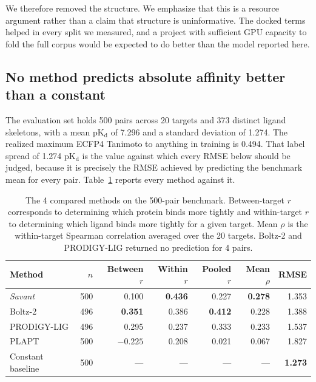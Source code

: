 \documentclass[times, twoside]{zHenriquesLab-StyleBioRxiv}
\newcommand{\savant}{\textit{Savant}\xspace}
\newcommand{\pkd}{\ensuremath{\mathrm{pK_d}}\xspace}
\begin{document}
We therefore removed the structure. We emphasize that this is a resource argument rather than a claim that structure is uninformative. The docked terms helped in every split we measured, and a project with sufficient GPU capacity to fold the full corpus would be expected to do better than the model reported here.

\subsection*{No method predicts absolute affinity better than a constant}

The evaluation set holds 500 pairs across 20 targets and 373 distinct ligand skeletons, with a mean \pkd of 7.296 and a standard deviation of 1.274. The realized maximum ECFP4 Tanimoto to anything in training is 0.494. That label spread of 1.274 \pkd is the value against which every RMSE below should be judged, because it is precisely the RMSE achieved by predicting the benchmark mean for every pair. Table~\ref{tab:benchmark} reports every method against it.

\begin{table}[h]
\centering
\caption{The 4 compared methods on the 500-pair benchmark. Between-target $r$ corresponds to determining which protein binds more tightly and within-target $r$ to determining which ligand binds more tightly for a given target. Mean $\rho$ is the within-target Spearman correlation averaged over the 20 targets. Boltz-2 and PRODIGY-LIG returned no prediction for 4 pairs.}
\label{tab:benchmark}
\small
\begin{tabular}{lrrrrrr}
\toprule
Method & $n$ & Between $r$ & Within $r$ & Pooled $r$ & Mean $\rho$ & RMSE \\
\midrule
\savant           & 500 & 0.100 & \textbf{0.436} & 0.227 & \textbf{0.278} & 1.353 \\
Boltz-2           & 496 & \textbf{0.351} & 0.386 & \textbf{0.412} & 0.228 & 1.388 \\
PRODIGY-LIG       & 496 & 0.295 & 0.237 & 0.333 & 0.233 & 1.537 \\
PLAPT             & 500 & $-0.225$ & 0.208 & 0.021 & 0.067 & 1.827 \\
\midrule
Constant baseline & 500 & ---   & ---   & ---   & ---   & \textbf{1.273} \\
\bottomrule
\end{tabular}
\end{table}
\end{document}
